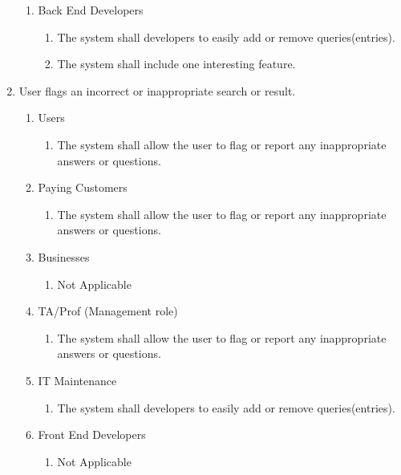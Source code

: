 \documentclass[titlepage]{article}
\begin{document}
\begin{enumerate}[\textbf{{BE}1.}]
\begin{enumerate}[\textbf{{VP5}.1}]
				\item Back End Developers
				\begin{enumerate}
					\item The system shall developers to easily add or remove queries(entries).
					\item The system shall include one interesting feature.
				\end{enumerate}
			\end{enumerate}
			
			\item User flags an incorrect or inappropriate search or result.
			\begin{enumerate}[\textbf{{VP6}.1}]
				
				\item Users
				\begin{enumerate}
					\item The system shall allow the user to flag or report any inappropriate answers or questions.
				\end{enumerate}
				
				\item Paying Customers
				\begin{enumerate}
					\item The system shall allow the user to flag or report any inappropriate answers or questions.
				\end{enumerate}
				
				\item Businesses
				\begin{enumerate}
					\item Not Applicable
				\end{enumerate}
				
				\item TA/Prof (Management role)
				\begin{enumerate}
					\item The system shall allow the user to flag or report any inappropriate answers or questions.
				\end{enumerate}
				
				\item IT Maintenance
				\begin{enumerate}
					\item The system shall developers to easily add or remove queries(entries).
				\end{enumerate}
				
				\item Front End Developers
				\begin{enumerate}
					\item Not Applicable
				\end{enumerate}
				

\end{enumerate}
\end{enumerate}
\end{document}
